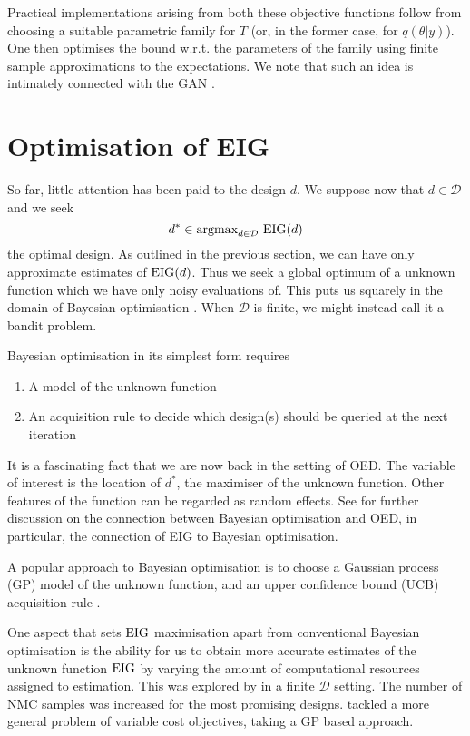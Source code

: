 Practical implementations arising from both these objective functions follow from choosing a suitable parametric family for $T$ (or, in the former case, for $q(\theta|y)$). One then optimises the bound w.r.t. the parameters of the family using finite sample approximations to the expectations. We note that such an idea is intimately connected with the GAN \cite{fgan}.

\section{Optimisation of EIG}
\label{sec:opteig}
So far, little attention has been paid to the design $d$. We suppose now that $d \in \mathcal{D}$ and we seek
\begin{equation}
	d^* \in \text{argmax}_{d\in\mathcal{D}} \  \text{EIG}(d)
\end{equation}
the optimal design. As outlined in the previous section, we can have only approximate estimates of $\text{EIG}(d)$. Thus we seek a global optimum of a unknown function which we have only noisy evaluations of. This puts us squarely in the domain of Bayesian optimisation \cite{shahriari2016}. When $\mathcal{D}$ is finite, we might instead call it a bandit problem.

Bayesian optimisation in its simplest form requires
\begin{enumerate}
	\item A model of the unknown function
	\item An acquisition rule to decide which design(s) should be queried at the next iteration
\end{enumerate}
It is a fascinating fact that we are now back in the setting of OED. The variable of interest is the location of $d^*$, the maximiser of the unknown function. Other features of the function can be regarded as random effects. See \cite{pes} for further discussion on the connection between Bayesian optimisation and OED, in particular, the connection of EIG to Bayesian optimisation.

A popular approach to Bayesian optimisation is to choose a Gaussian process (GP) model of the unknown function, and an upper confidence bound (UCB) acquisition rule \cite{srinivas2009}.

One aspect that sets $\text{EIG}$ maximisation apart from conventional Bayesian optimisation is the ability for us to obtain more accurate estimates of the unknown function $\text{EIG}$ by varying the amount of computational resources assigned to estimation. This was explored by \cite{vincent2017} in a finite $\mathcal{D}$ setting. The number of NMC samples was increased for the most promising designs. \cite{mcleod2017} tackled a more general problem of variable cost objectives, taking a GP based approach.

